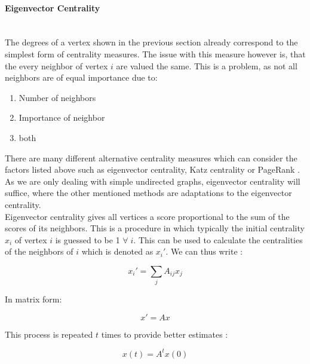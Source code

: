 	\paragraph{Eigenvector Centrality} \mbox{}\\

	\noindent The degrees of a vertex shown in the previous section already 
	correspond to the simplest form of centrality measures. The issue with this 
	measure however is, that the every neighbor of vertex $i$ are valued the same. 
	This is a problem, as not all neighbors are of equal importance due to:

	\begin{enumerate}
		\item Number of neighbors
		\item Importance of neighbor
		\item both
	\end{enumerate}

	\noindent There are many different alternative centrality measures which
	can consider the factors listed above such as eigenvector centrality, Katz
	centrality or PageRank
	\citep{katz1953new,page1999pagerank,landau1895relativen,Newman2010}. As we 
	are only dealing with simple undirected graphs, eigenvector centrality will 
	suffice, where the other mentioned methods are adaptations to the 
	eigenvector centrality. \\

	\noindent Eigenvector centrality gives all vertices a score proportional to
	the sum of the scores of its neighbors. This is a procedure in which
	typically the initial centrality $x_i$ of vertex $i$ is guessed to be 1
	$\forall \; i$. This can be used to calculate the centralities of the
	neighbors of $i$ which is denoted as $x_{i}'$. We can thus write
	\citep[p. 169]{Newman2010}:

	\begin{equation}
		x_i' = \sum_{j}A_{ij}x_j
	\end{equation}

	\noindent In matrix form:

	\begin{equation}
		x' = Ax
	\end{equation}

	\noindent This process is repeated $t$ times to provide better estimates
	\citep[p. 170]{Newman2010}:

	\begin{equation}
		x(t) =  A^tx(0)
	\end{equation}

